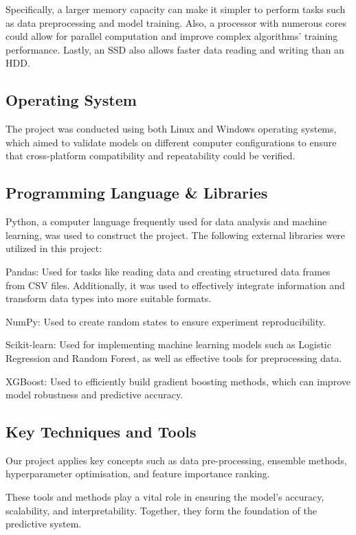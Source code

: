 \documentclass[conference]{IEEEtran}
\begin{document}
Specifically, a larger memory capacity can make it simpler to perform tasks such as data preprocessing and model training. Also, a processor with numerous cores could allow for parallel computation and improve complex algorithms' training performance. Lastly, an SSD also allows faster data reading and writing than an HDD.

\subsection{Operating System}

The project was conducted using both Linux and Windows operating systems, which aimed to validate models on different computer configurations to ensure that cross-platform compatibility and repeatability could be verified.

\subsection{Programming Language \& Libraries}
Python, a computer language frequently used for data analysis and machine learning, was used to construct the project. The following external libraries were utilized in this project:

Pandas: Used for tasks like reading data and creating structured data frames from CSV files. Additionally, it was used to effectively integrate information and transform data types into more suitable formats. 

NumPy: Used to create random states to ensure experiment reproducibility.

Scikit-learn: Used for implementing machine learning models such as Logistic Regression and Random Forest, as well as effective tools for preprocessing data. 

XGBoost: Used to efficiently build gradient boosting methods, which can improve model robustness and predictive accuracy.


\subsection{Key Techniques and Tools}
\begin{flushleft}
Our project applies key concepts such as data pre-processing, ensemble methods, 
hyperparameter op\-timisation, and feature importance ranking. 

These tools and methods play a vital role in ensuring the model's accuracy, scalability, 
and interpretability. Together, they form the foundation of the predictive system.
\end{flushleft}
\end{document}
